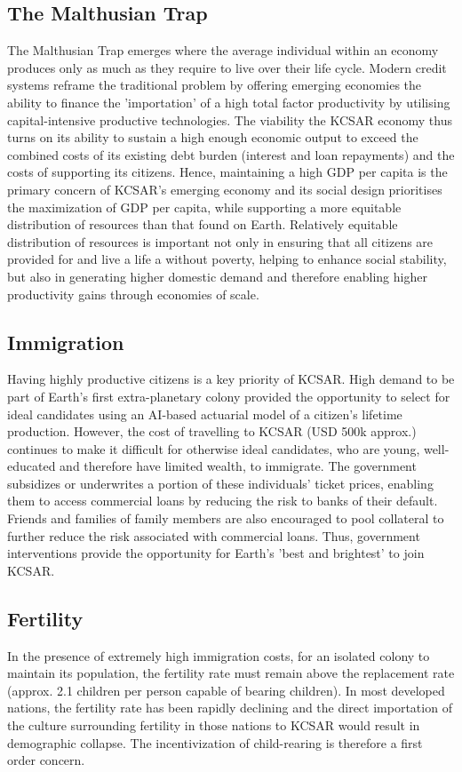 \documentclass[fleqn,10pt]{Stylesheet} %
\begin{document}
\subsection{The Malthusian Trap}
The Malthusian Trap emerges where the average individual within an economy produces only as much as they require to live over their life cycle. Modern credit systems reframe the traditional problem by offering emerging economies the ability to finance the 'importation' of a high total factor productivity by utilising capital-intensive productive technologies. The viability the KCSAR economy thus turns on its ability to sustain a high enough economic output to exceed the combined costs of its existing debt burden (interest and loan repayments) and the costs of supporting its citizens. Hence, maintaining a high GDP per capita is the primary concern of KCSAR's emerging economy and its social design prioritises the maximization of GDP per capita, while supporting a more equitable distribution of resources than that found on Earth. Relatively equitable distribution of resources is important not only in ensuring that all citizens are provided for and live a life a without poverty, helping to enhance social stability, but also in generating higher domestic demand and therefore enabling higher productivity gains through economies of scale. \cite{Kogel} 

\subsection{Immigration}
Having highly productive citizens is a key priority of KCSAR. High demand to be part of Earth's first extra-planetary colony provided the opportunity to select for ideal candidates using an AI-based actuarial model of a citizen's lifetime production. However, the cost of travelling to KCSAR (USD 500k approx.) continues to make it difficult for otherwise ideal candidates, who are young, well-educated and therefore have limited wealth, to immigrate. The government subsidizes or underwrites a portion of these individuals' ticket prices, enabling them to access commercial loans by reducing the risk to banks of their default. Friends and families of family members are also encouraged to pool collateral to further reduce the risk associated with commercial loans. Thus, government interventions provide the opportunity for Earth's 'best and brightest' to join KCSAR.

\subsection{Fertility}
In the presence of extremely high immigration costs, for an isolated colony to maintain its population, the fertility rate must remain above the replacement rate (approx. 2.1 children per person capable of bearing children). In most developed nations, the fertility rate has been rapidly declining and the direct importation of the culture surrounding fertility in those nations to KCSAR would result in demographic collapse. The incentivization of child-rearing is therefore a first order concern.
\end{document}
